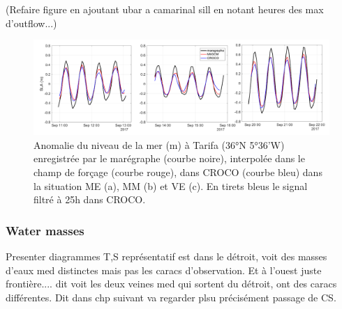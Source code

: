 (Refaire figure en ajoutant ubar a camarinal sill en notant heures des max d'outflow...)





\begin{figure}[!h]
        \includegraphics[width=\textwidth]{./GBR3D/SLA_Tarifa_ME2VE2IES.png}
        \caption{Anomalie du niveau de la mer (m) à Tarifa (36°N 5°36'W) enregistrée par le marégraphe  (courbe noire),
        interpolée dans le champ de forçage (courbe rouge), dans CROCO (courbe bleu) dans la situation ME (a), MM (b) et VE (c).
        En tirets bleus le signal filtré à 25h dans CROCO.}
        \label{fig_maree_tar}
\end{figure}

\subsubsection{Water masses}
Presenter diagrammes T,S représentatif est dans le détroit, voit des masses d'eaux med distinctes mais pas les caracs d'observation. Et à l'ouest juste frontière.... dit voit les deux veines med qui sortent du détroit, ont des caracs différentes. Dit dans chp suivant va regarder plsu précisément passage de CS.

